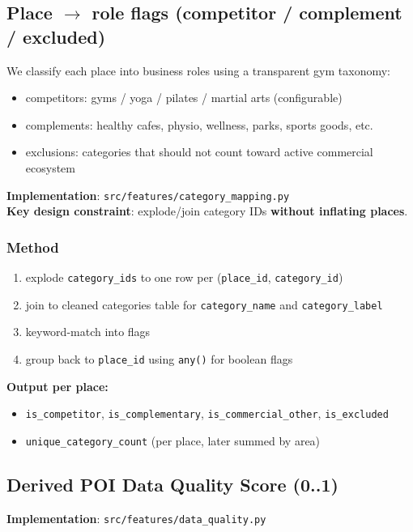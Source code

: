 \documentclass[11pt]{article}
\begin{document}
\subsection{Place $\rightarrow$ role flags (competitor / complement / excluded)}
We classify each place into business roles using a transparent gym taxonomy:
\begin{itemize}
  \item competitors: gyms / yoga / pilates / martial arts (configurable)
  \item complements: healthy cafes, physio, wellness, parks, sports goods, etc.
  \item exclusions: categories that should not count toward active commercial ecosystem
\end{itemize}

\noindent\textbf{Implementation}: \texttt{src/features/category\_mapping.py}\\
\textbf{Key design constraint}: explode/join category IDs \textbf{without inflating places}.

\subsubsection*{Method}
\begin{enumerate}
  \item explode \texttt{category\_ids} to one row per (\texttt{place\_id}, \texttt{category\_id})
  \item join to cleaned categories table for \texttt{category\_name} and \texttt{category\_label}
  \item keyword-match into flags
  \item group back to \texttt{place\_id} using \texttt{any()} for boolean flags
\end{enumerate}

\noindent\textbf{Output per place:}
\begin{itemize}
  \item \texttt{is\_competitor}, \texttt{is\_complementary}, \texttt{is\_commercial\_other}, \texttt{is\_excluded}
  \item \texttt{unique\_category\_count} (per place, later summed by area)
\end{itemize}

\subsection{Derived POI Data Quality Score (0..1)}
\noindent\textbf{Implementation}: \texttt{src/features/data\_quality.py}
\end{document}
